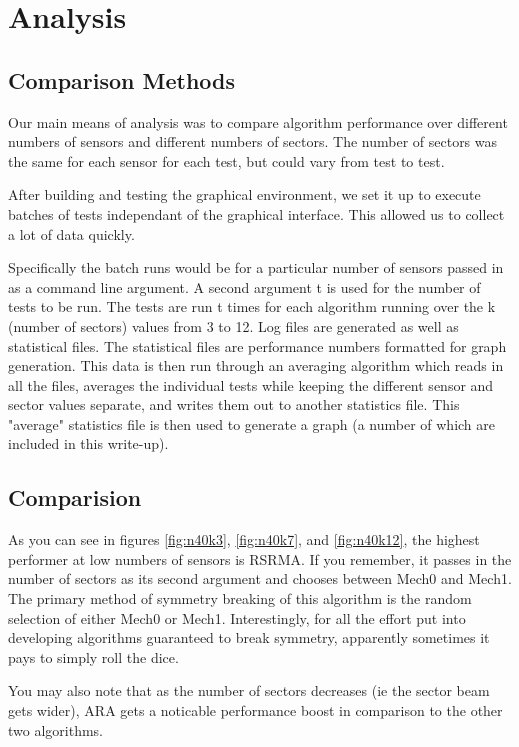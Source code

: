 \section{Analysis}

\subsection{Comparison Methods}

Our main means of analysis was to compare algorithm performance over different numbers of sensors and different numbers of sectors. The number of sectors was the same for each sensor for each test, but could vary from test to test.

After building and testing the graphical environment, we set it up to execute batches of tests independant of the graphical interface. This allowed us to collect a lot of data quickly.

Specifically the batch runs would be for a particular number of sensors passed in as a command line argument. A second argument t is used for the number of tests to be run. The tests are run t times for each algorithm running over the k (number of sectors) values from 3 to 12. Log files are generated as well as statistical files. The statistical files are performance numbers formatted for graph generation. 
This data is then run through an averaging algorithm which reads in all the files, averages the individual tests while keeping the different sensor and sector values separate, and writes them out to another statistics file. This "average" statistics file is then used to generate a graph (a number of which are included in this write-up).

\subsection{Comparision}

As you can see in figures \ref{fig:n40k3}, \ref{fig:n40k7}, and \ref{fig:n40k12}, the highest performer at low numbers of sensors is RSRMA. If you remember, it passes in the number of sectors as its second argument and chooses between Mech0 and Mech1. The primary method of symmetry breaking of this algorithm is the random selection of either Mech0 or Mech1. Interestingly, for all the effort put into developing algorithms guaranteed to break symmetry, apparently sometimes it pays to simply roll the dice. 

You may also note that as the number of sectors decreases (ie the sector beam gets wider), ARA gets a noticable performance boost in comparison to the other two algorithms. 



